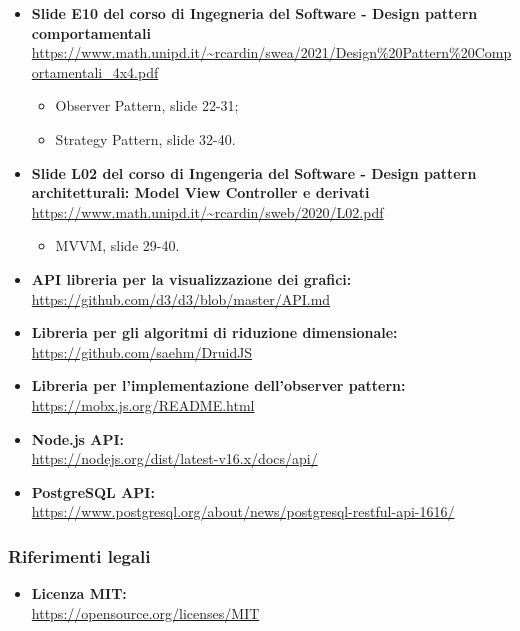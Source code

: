 \begin{itemize}
	
	\item \textbf{Slide E10 del corso di Ingegneria del Software - Design pattern comportamentali}\\
\textcolor{blue}{\url{https://www.math.unipd.it/~rcardin/swea/2021/Design\%20Pattern\%20Comportamentali_4x4.pdf}}	
	
		\begin{itemize}
			\item Observer Pattern, slide 22-31;
			\item Strategy Pattern, slide 32-40.
		\end{itemize}
	\item \textbf{Slide L02 del corso di Ingengeria del Software - Design pattern architetturali: Model View Controller e derivati}\\
	\textcolor{blue}{\url{https://www.math.unipd.it/~rcardin/sweb/2020/L02.pdf}}	

\begin{itemize}
			\item MVVM, slide 29-40.
		\end{itemize}
	
	\item \textbf{API libreria per la visualizzazione dei grafici:}\\
	\textcolor{blue}{\url{https://github.com/d3/d3/blob/master/API.md}}
	
	\item \textbf{Libreria per gli algoritmi di riduzione dimensionale:}\\
	\textcolor{blue}{\url{https://github.com/saehm/DruidJS}}
	
	\item \textbf{Libreria per l'implementazione dell'observer pattern:}\\
	\textcolor{blue}{\url{https://mobx.js.org/README.html}}
	
	\item \textbf{Node.js API:}\\
	\textcolor{blue}{\url{https://nodejs.org/dist/latest-v16.x/docs/api/}}
	
	\item \textbf{PostgreSQL API:}\\
	\textcolor{blue}{\url{https://www.postgresql.org/about/news/postgresql-restful-api-1616/}}
\end{itemize}

\subsubsection{Riferimenti legali}
\begin{itemize}
\item \textbf{Licenza MIT:}\\
\textcolor{blue}{\url{https://opensource.org/licenses/MIT}}
\end{itemize}
	